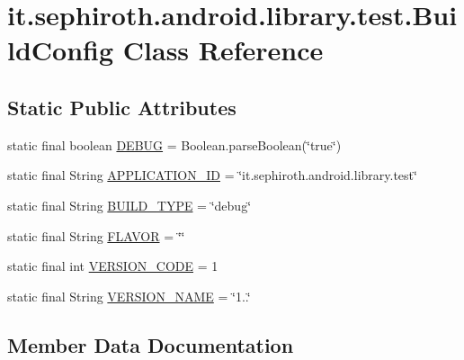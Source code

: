 \hypertarget{classit_1_1sephiroth_1_1android_1_1library_1_1test_1_1_build_config}{}\section{it.\+sephiroth.\+android.\+library.\+test.\+Build\+Config Class Reference}
\label{classit_1_1sephiroth_1_1android_1_1library_1_1test_1_1_build_config}
\subsection*{Static Public Attributes}
\begin{DoxyCompactItemize}
\item 
static final boolean \hyperlink{classit_1_1sephiroth_1_1android_1_1library_1_1test_1_1_build_config_a82e3616b787ce9e4cd08d102a356698e}{D\+E\+B\+UG} = Boolean.\+parse\+Boolean(\char`\"{}true\char`\"{})
\item 
static final String \hyperlink{classit_1_1sephiroth_1_1android_1_1library_1_1test_1_1_build_config_a962010f7b951d64f52aa2cea50c0162a}{A\+P\+P\+L\+I\+C\+A\+T\+I\+O\+N\+\_\+\+ID} = \char`\"{}it.\+sephiroth.\+android.\+library.\+test\char`\"{}
\item 
static final String \hyperlink{classit_1_1sephiroth_1_1android_1_1library_1_1test_1_1_build_config_ae17d0be943c4495efd2cf0001d4f2df2}{B\+U\+I\+L\+D\+\_\+\+T\+Y\+PE} = \char`\"{}debug\char`\"{}
\item 
static final String \hyperlink{classit_1_1sephiroth_1_1android_1_1library_1_1test_1_1_build_config_a63edc4ff32c993b142d4bb8355d79e73}{F\+L\+A\+V\+OR} = \char`\"{}\char`\"{}
\item 
static final int \hyperlink{classit_1_1sephiroth_1_1android_1_1library_1_1test_1_1_build_config_aed455a2a3276545a5735d4dac954ed47}{V\+E\+R\+S\+I\+O\+N\+\_\+\+C\+O\+DE} = 1
\item 
static final String \hyperlink{classit_1_1sephiroth_1_1android_1_1library_1_1test_1_1_build_config_aaaacfa6b7659ae354307c5ed964f61dd}{V\+E\+R\+S\+I\+O\+N\+\_\+\+N\+A\+ME} = \char`\"{}1..\char`\"{}
\end{DoxyCompactItemize}


\subsection{Member Data Documentation}
\mbox{\label{classit_1_1sephiroth_1_1android_1_1library_1_1test_1_1_build_config_a962010f7b951d64f52aa2cea50c0162a}} 
